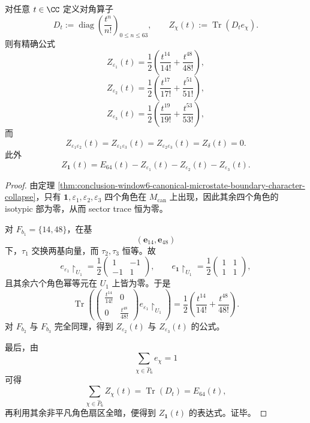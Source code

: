 \begin{theorem}\label{thm:conclusion-window6-factorial-superselection-trace-closed-form}
对任意 \(t\in \CC\) 定义对角算子
\[
D_t:=\operatorname{diag}\!\left(\frac{t^n}{n!}\right)_{0\le n\le 63},
\qquad
Z_{\chi}(t):=\operatorname{Tr}(D_t e_{\chi}).
\]
则有精确公式
\[
Z_{\varepsilon_1}(t)=\frac12\left(\frac{t^{14}}{14!}+\frac{t^{48}}{48!}\right),
\]
\[
Z_{\varepsilon_2}(t)=\frac12\left(\frac{t^{17}}{17!}+\frac{t^{51}}{51!}\right),
\]
\[
Z_{\varepsilon_3}(t)=\frac12\left(\frac{t^{19}}{19!}+\frac{t^{53}}{53!}\right),
\]
而
\[
Z_{\varepsilon_1\varepsilon_2}(t)
=
Z_{\varepsilon_1\varepsilon_3}(t)
=
Z_{\varepsilon_2\varepsilon_3}(t)
=
Z_{\delta}(t)
=0.
\]
此外
\[
Z_{\mathbf 1}(t)
=
E_{64}(t)-Z_{\varepsilon_1}(t)-Z_{\varepsilon_2}(t)-Z_{\varepsilon_3}(t).
\]
\end{theorem}
\begin{proof}
由定理 \ref{thm:conclusion-window6-canonical-microstate-boundary-character-collapse}，只有 \(\mathbf 1,\varepsilon_1,\varepsilon_2,\varepsilon_3\) 四个角色在 \(M_{\mathrm{can}}\) 上出现，因此其余四个角色的 isotypic 部为零，从而 sector trace 恒为零。

对 \(F_{b_1}=\{14,48\}\)，在基
\[
(\mathbf e_{14},\mathbf e_{48})
\]
下，\(\tau_1\) 交换两基向量，而 \(\tau_2,\tau_3\) 恒等。故
\[
e_{\varepsilon_1}\!\restriction_{U_1}
=
\frac12
\begin{pmatrix}
1&-1\\
-1&1
\end{pmatrix},
\qquad
e_{\mathbf 1}\!\restriction_{U_1}
=
\frac12
\begin{pmatrix}
1&1\\
1&1
\end{pmatrix},
\]
且其余六个角色幂等元在 \(U_1\) 上皆为零。于是
\[
\operatorname{Tr}\!\left(
\begin{pmatrix}
\frac{t^{14}}{14!}&0\\
0&\frac{t^{48}}{48!}
\end{pmatrix}
e_{\varepsilon_1}\!\restriction_{U_1}
\right)
=
\frac12\left(\frac{t^{14}}{14!}+\frac{t^{48}}{48!}\right).
\]
对 \(F_{b_2}\) 与 \(F_{b_3}\) 完全同理，得到 \(Z_{\varepsilon_2}(t)\) 与 \(Z_{\varepsilon_3}(t)\) 的公式。

最后，由
\[
\sum_{\chi\in\widehat P_6}e_{\chi}=1
\]
可得
\[
\sum_{\chi\in\widehat P_6}Z_{\chi}(t)=\operatorname{Tr}(D_t)=E_{64}(t),
\]
再利用其余非平凡角色扇区全暗，便得到 \(Z_{\mathbf 1}(t)\) 的表达式。证毕。
\end{proof}

